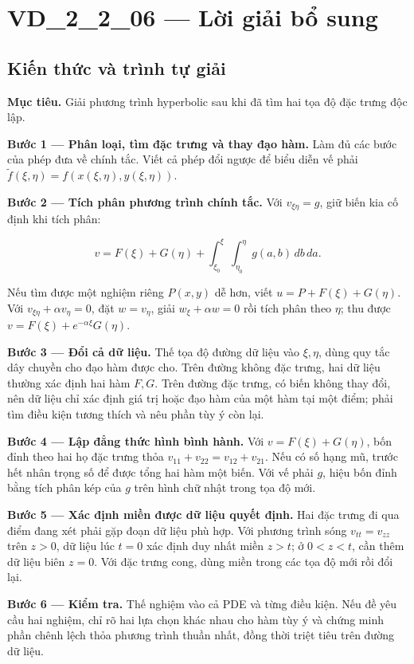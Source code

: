 \documentclass[10pt,a4paper]{article}
\begin{document}
\section*{VD\_2\_2\_06 — Lời giải bổ sung}
\subsection*{Kiến thức và trình tự giải}
\textbf{Mục tiêu.} Giải phương trình hyperbolic sau khi đã tìm hai tọa độ đặc trưng độc lập.

\textbf{Bước 1 — Phân loại, tìm đặc trưng và thay đạo hàm.} Làm đủ các bước của phép đưa về chính tắc. Viết cả phép đổi ngược để biểu diễn vế phải $\widetilde f(\xi,\eta)=f(x(\xi,\eta),y(\xi,\eta))$.

\textbf{Bước 2 — Tích phân phương trình chính tắc.} Với $v_{\xi\eta}=g$, giữ biến kia cố định khi tích phân:


\[
v=F(\xi)+G(\eta)+\int_{\xi_0}^{\xi}\int_{\eta_0}^{\eta}g(a,b)\,db\,da.
\]


Nếu tìm được một nghiệm riêng $P(x,y)$ dễ hơn, viết $u=P+F(\xi)+G(\eta)$. Với $v_{\xi\eta}+\alpha v_\eta=0$, đặt $w=v_\eta$, giải $w_\xi+\alpha w=0$ rồi tích phân theo $\eta$; thu được $v=F(\xi)+e^{-\alpha\xi}G(\eta)$.

\textbf{Bước 3 — Đổi cả dữ liệu.} Thế tọa độ đường dữ liệu vào $\xi,\eta$, dùng quy tắc dây chuyền cho đạo hàm được cho. Trên đường không đặc trưng, hai dữ liệu thường xác định hai hàm $F,G$. Trên đường đặc trưng, có biến không thay đổi, nên dữ liệu chỉ xác định giá trị hoặc đạo hàm của một hàm tại một điểm; phải tìm điều kiện tương thích và nêu phần tùy ý còn lại.

\textbf{Bước 4 — Lập đẳng thức hình bình hành.} Với $v=F(\xi)+G(\eta)$, bốn đỉnh theo hai họ đặc trưng thỏa $v_{11}+v_{22}=v_{12}+v_{21}$. Nếu có số hạng mũ, trước hết nhân trọng số để được tổng hai hàm một biến. Với vế phải $g$, hiệu bốn đỉnh bằng tích phân kép của $g$ trên hình chữ nhật trong tọa độ mới.

\textbf{Bước 5 — Xác định miền được dữ liệu quyết định.} Hai đặc trưng đi qua điểm đang xét phải gặp đoạn dữ liệu phù hợp. Với phương trình sóng $v_{tt}=v_{zz}$ trên $z>0$, dữ liệu lúc $t=0$ xác định duy nhất miền $z>t$; ở $0<z<t$, cần thêm dữ liệu biên $z=0$. Với đặc trưng cong, dùng miền trong các tọa độ mới rồi đổi lại.

\textbf{Bước 6 — Kiểm tra.} Thế nghiệm vào cả PDE và từng điều kiện. Nếu đề yêu cầu hai nghiệm, chỉ rõ hai lựa chọn khác nhau cho hàm tùy ý và chứng minh phần chênh lệch thỏa phương trình thuần nhất, đồng thời triệt tiêu trên đường dữ liệu.
\end{document}
